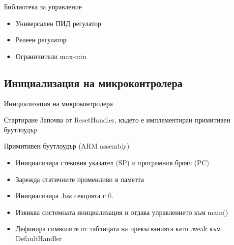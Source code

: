 \documentclass{beamer}
\begin{document}
\begin{frame}[t]
	\pause
	\begin{block}{Библиотека за управление}
		\begin{itemize}
			\pause
			\item Универсален ПИД регулатор
			\pause
			\item Релеен регулатор
			\pause
			\item Ограничители max-min
		\end{itemize}
	\end{block}

\end{frame}

\subsection{Инициализация на микроконтролера}

\begin{frame}{Инициализация на микроконтролера}
	\pause
	\begin{block}{Стартиране}
		\pause
		Започва от ResetHandler, където е  имплементиран примитивен буутлоудър
	\end{block}

\end{frame}

\begin{frame}[t]
	\pause
	\begin{block}{Примитивен буутлоудър (ARM assembly)}
		\begin{itemize}
			\pause
			\item Инициализира стековия указател (SP) и програмния брояч (PC)
			\pause
			\item Зарежда статичните променливи в паметта
			\pause
			\item Инициализира .bss секцията с 0.
			\pause
			\item Извиква системната инициализация и отдава управлението към main()
			\pause
			\item Дефинира символите от таблицата на прекъсванията като .weak към DefaultHandler 
		\end{itemize}
	\end{block}
\end{frame}
\end{document}
